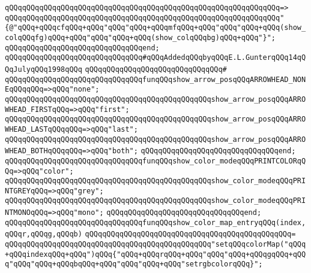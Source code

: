 \verb|qQQqqQQqqQQqqQQqqQQqqQQqqQQqqQQqqQQqqQQqqQQqqQQqqQQqqQQqqQQqqQQq=>|\newline
\verb|qQQqqQQqqQQqqQQqqQQqqQQqqQQqqQQqqQQqqQQqqQQqqQQqqQQqqQQqqQQqqQQq"{@"qQQq+qQQqcfqQQq+qQQq"qQQq"qQQq+qQQqmfqQQq+qQQq"qQQq"qQQq+qQQq(show_colqQQqfg)qQQq+qQQq"qQQq"qQQq+qQQq(show_colqQQqbg)qQQq+qQQq"}";|\newline
\verb|qQQqqQQqqQQqqQQqqQQqqQQqqQQqqQQqend;|\newline
\newline
\verb|qQQqqQQqqQQqqQQqqQQqqQQqqQQqqQQq#qQQqAddedqQQqbyqQQqE.L.GunterqQQq14qQQqJulyqQQq1998qQQq|\newline
\verb|qQQqqQQqqQQqqQQqqQQqqQQqqQQqqQQq#|\newline
\verb|qQQqqQQqqQQqqQQqqQQqqQQqqQQqqQQqfunqQQqshow_arrow_posqQQqARROWHEAD_NONEqQQqqQQq=>qQQq"none";|\newline
\verb|qQQqqQQqqQQqqQQqqQQqqQQqqQQqqQQqqQQqqQQqqQQqqQQqshow_arrow_posqQQqARROWHEAD_FIRSTqQQq=>qQQq"first";|\newline
\verb|qQQqqQQqqQQqqQQqqQQqqQQqqQQqqQQqqQQqqQQqqQQqqQQqshow_arrow_posqQQqARROWHEAD_LASTqQQqqQQq=>qQQq"last";|\newline
\verb|qQQqqQQqqQQqqQQqqQQqqQQqqQQqqQQqqQQqqQQqqQQqqQQqshow_arrow_posqQQqARROWHEAD_BOTHqQQqqQQq=>qQQq"both";|\newline
\verb|qQQqqQQqqQQqqQQqqQQqqQQqqQQqqQQqend;|\newline
\newline
\verb|qQQqqQQqqQQqqQQqqQQqqQQqqQQqqQQqfunqQQqshow_color_modeqQQqPRINTCOLORqQQq=>qQQq"color";|\newline
\verb|qQQqqQQqqQQqqQQqqQQqqQQqqQQqqQQqqQQqqQQqqQQqqQQqshow_color_modeqQQqPRINTGREYqQQq=>qQQq"grey";|\newline
\verb|qQQqqQQqqQQqqQQqqQQqqQQqqQQqqQQqqQQqqQQqqQQqqQQqshow_color_modeqQQqPRINTMONOqQQq=>qQQq"mono";|\newline
\verb|qQQqqQQqqQQqqQQqqQQqqQQqqQQqqQQqend;|\newline
\newline
\verb|qQQqqQQqqQQqqQQqqQQqqQQqqQQqqQQqfunqQQqshow_color_map_entryqQQq(index,qQQqr,qQQqg,qQQqb)|\newline
\verb|qQQqqQQqqQQqqQQqqQQqqQQqqQQqqQQqqQQqqQQqqQQqqQQq=|\newline
\verb|qQQqqQQqqQQqqQQqqQQqqQQqqQQqqQQqqQQqqQQqqQQqqQQq"setqQQqcolorMap("qQQq+qQQqindexqQQq+qQQq")qQQq{"qQQq+qQQqrqQQq+qQQq"qQQq"qQQq+qQQqgqQQq+qQQq"qQQq"qQQq+qQQqbqQQq+qQQq"qQQq"qQQq+qQQq"setrgbcolorqQQq}";|\newline
\newline

